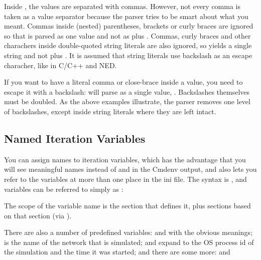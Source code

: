 \begin{note}
Inside , the values are separated with commas. However,
not every comma is taken as a value separator because the parser
tries to be smart about what you meant. Commas inside (nested) parentheses,
brackets or curly braces are ignored so that  is
parsed as one value and not as  plus . Commas, curly
braces and other charachers inside double-quoted string literals are
also ignored, so  yields a single 
string and not  plus . It is assumed that string literals
use backslash as an escape characher, like in C/C++ and NED.

If you want to have a literal comma or close-brace inside a value, you need
to escape it with a backslash: 
will parse as a single value, . Backslashes themselves must be doubled.
As the above examples illustrate, the parser removes one level of backslashes,
except inside string literals where they are left intact.
\end{note}


\subsection{Named Iteration Variables}

You can assign names to iteration variables, which has the advantage
that you will see meaningful names instead of  and
 in the Cmdenv output, and also lets you refer to the variables at
more than one place in the ini file. The syntax is
, and variables can be referred to simply as
:


The scope of the variable name is the section that defines it, plus
sections based on that section (via ).

There are also a number of predefined variables:  and
 with the obvious meanings;  is the name of
the network that is simulated;  and 
expand to the OS process id of the simulation and the time it was
started; and there are some more:   and

